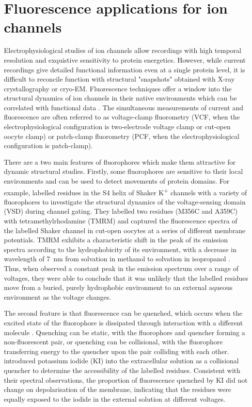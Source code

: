 \section{Fluorescence applications for ion channels}

Electrophysiological studies of ion channels allow recordings with high temporal resolution and exquistive sensitivity to protein energetics.
However, while current recordings give detailed functional information even at a single protein level, it is difficult to reconcile function with structural "snapshots" obtained with X-ray crystallography or cryo-EM.
Fluorescence techniques offer a window into the structural dynamics of ion channels in their native environments which can be correlated with functional data \cite{zheng_handbook_2015}.
The simultaneous measurements of current and fluorescence are often referred to as voltage-clamp fluorometry (VCF, when the electrophysiological configuration is two-electrode voltage clamp or cut-open oocyte clamp) or patch-clamp fluorometry (PCF, when the electrophysiological configuration is patch-clamp).

There are a two main features of fluorophores which make them attractive for dynamic structural studies.
Firstly, some fluorophores are sensitive to their local environments and can be used to detect movements of protein domains.
For example, \textcite{cha_characterizing_1997} labelled residues in the S4 helix of Shaker K\textsuperscript{+} channels with a variety of fluorophores to investigate the structural dynamics of the voltage-sensing domain (VSD) during channel gating.
They labelled two residues (M356C and A359C) with tetramethylrhodamine (TMRM) and captured the fluorescence spectra of the labelled Shaker channel in cut-open oocytes at a series of different membrane potentials.
TMRM exhibits a characteristic shift in the peak of its emission spectra according to the hydrophobicity of its environment, with a decrease in wavelength of \SI{7}{\nano\metre} from solvation in methanol to solvation in isopropanol \cite{cha_characterizing_1997}.
Thus, when \textcite{cha_characterizing_1997} observed a constant peak in the emission spectrum over a range of voltages, they were able to conclude that it was unlikely that the labelled residues move from a buried, purely hydrophobic environment to an external aqueous environment as the voltage changes.

The second feature is that fluorescence can be quenched, which occurs when the excited state of the fluorophore is dissipated through interaction with a different molecule \cite{zheng_handbook_2015}.
Quenching can be static, with the fluorophore and quencher forming a non-fluorescent pair, or quenching can be collisional, with the fluorophore transferring energy to the quencher upon the pair colliding with each other.
\textcite{cha_characterizing_1997} introduced potassium iodide (KI) into the extracellular solution as a collisional quencher to determine the accessibility of the labelled residues.
Consistent with their spectral observations, the proportion of fluorescence quenched by KI did not change on depolarisation of the membrane, indicating that the residues were equally exposed to the iodide in the external solution at different voltages.

